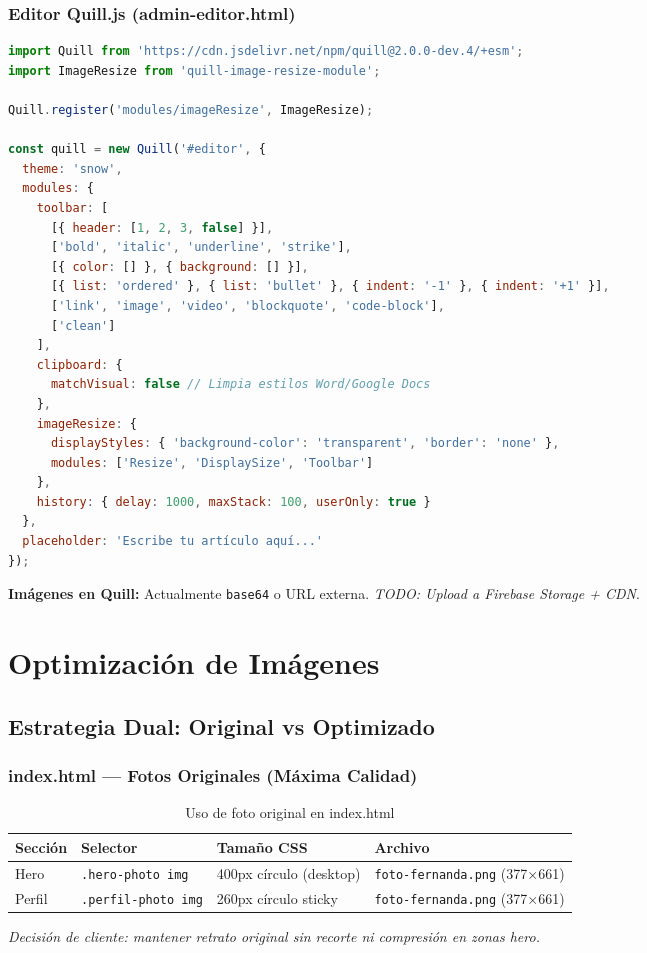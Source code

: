 \documentclass[12pt,a4paper,spanish]{report}
\begin{document}
\subsection{Editor Quill.js (admin-editor.html)}
\begin{lstlisting}[language=JavaScript, caption={Configuración Quill.js}]
import Quill from 'https://cdn.jsdelivr.net/npm/quill@2.0.0-dev.4/+esm';
import ImageResize from 'quill-image-resize-module';

Quill.register('modules/imageResize', ImageResize);

const quill = new Quill('#editor', {
  theme: 'snow',
  modules: {
    toolbar: [
      [{ header: [1, 2, 3, false] }],
      ['bold', 'italic', 'underline', 'strike'],
      [{ color: [] }, { background: [] }],
      [{ list: 'ordered' }, { list: 'bullet' }, { indent: '-1' }, { indent: '+1' }],
      ['link', 'image', 'video', 'blockquote', 'code-block'],
      ['clean']
    ],
    clipboard: {
      matchVisual: false // Limpia estilos Word/Google Docs
    },
    imageResize: {
      displayStyles: { 'background-color': 'transparent', 'border': 'none' },
      modules: ['Resize', 'DisplaySize', 'Toolbar']
    },
    history: { delay: 1000, maxStack: 100, userOnly: true }
  },
  placeholder: 'Escribe tu artículo aquí...'
});
\end{lstlisting}

\textbf{Imágenes en Quill:} Actualmente \texttt{base64} o URL externa. \textit{TODO: Upload a Firebase Storage + CDN}.

\chapter{Optimización de Imágenes}
\label{ch:imagenes}

\section{Estrategia Dual: Original vs Optimizado}

\subsection{index.html — Fotos Originales (Máxima Calidad)}
\begin{table}[H]
    \centering
    \caption{Uso de foto original en index.html}
    \label{tab:foto-original}
    \begin{tabular}{llll}
        \toprule
        \textbf{Sección} & \textbf{Selector} & \textbf{Tamaño CSS} & \textbf{Archivo} \\
        \midrule
        Hero & \texttt{.hero-photo img} & 400px círculo (desktop) & \texttt{foto-fernanda.png} (377$\times$661) \\
        Perfil & \texttt{.perfil-photo img} & 260px círculo sticky & \texttt{foto-fernanda.png} (377$\times$661) \\
        \bottomrule
    \end{tabular}
\end{table}
\textit{Decisión de cliente: mantener retrato original sin recorte ni compresión en zonas hero.}
\end{document}
